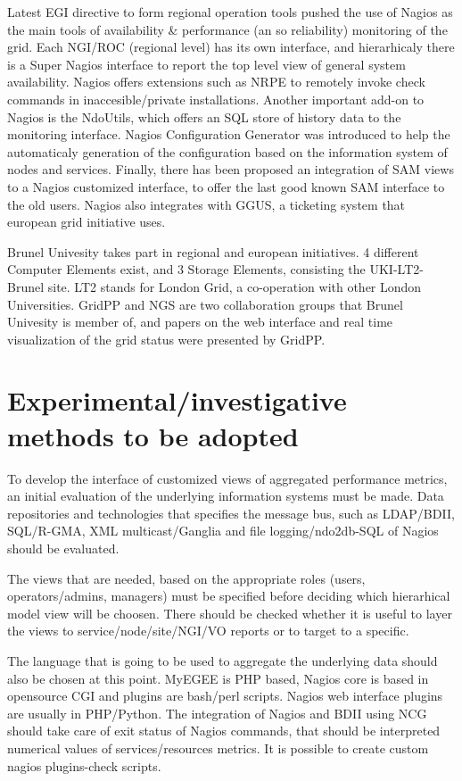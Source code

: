 Latest EGI directive to form regional operation tools pushed the use of Nagios
\cite{imamagic2007grid} as the main tools of availability \& performance (an so
reliability) monitoring of the grid. Each NGI/ROC (regional level) has its own
interface, and hierarhicaly there is a Super Nagios interface to report the top
level view of general system availability. Nagios offers extensions such as NRPE
to remotely invoke check commands in inaccesible/private installations.
Another important add-on to Nagios is the NdoUtils, which offers an SQL store
of history data to the monitoring interface. Nagios Configuration Generator was
introduced to help the automaticaly generation of the configuration based on
the information system of nodes and services. Finally, there has been proposed
an integration of SAM views to a Nagios customized interface, to offer the last
good known SAM interface to the old users. Nagios also integrates with GGUS, a
ticketing system that european grid initiative uses.

Brunel Univesity takes part in regional and european initiatives. 4 different
Computer Elements exist, and 3 Storage Elements, consisting the UKI-LT2-Brunel
site. LT2 stands for London Grid, a co-operation with other London Universities.
GridPP and NGS are two collaboration groups that Brunel Univesity is member of,
and papers on the web interface \cite{Hobson2007} and real time visualization of
the grid status were presented \cite{Huang2007} by GridPP.

\section[Experimental]{Experimental/investigative methods to be adopted}

To develop the interface of customized views of aggregated performance metrics,
an initial evaluation of the underlying information systems must be made. Data
repositories and technologies that specifies the message bus, such as LDAP/BDII,
SQL/R-GMA, XML multicast/Ganglia and file logging/ndo2db-SQL of Nagios should be
evaluated. 

The views that are needed, based on the appropriate roles (users,
operators/admins, managers) must be specified before deciding which hierarhical
model view will be choosen. There should be checked whether it is useful to
layer the views to service/node/site/NGI/VO reports or to target to a specific.

The language that is going to be used to aggregate the underlying data should
also be chosen at this point. MyEGEE is PHP  based, Nagios core is based in
opensource CGI and plugins are bash/perl scripts. Nagios web interface plugins
are usually in PHP/Python. The integration of Nagios and BDII using NCG should
take care of exit status of Nagios commands, that should be interpreted
numerical values of services/resources metrics. It is possible to create custom
nagios plugins-check scripts. 

